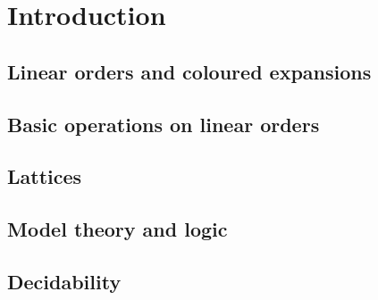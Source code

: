 
\chapter{Introduction}


\section{Linear orders and coloured expansions}


\section{Basic operations on linear orders}


\section{Lattices}


\section{Model theory and logic}


\section{Decidability}
